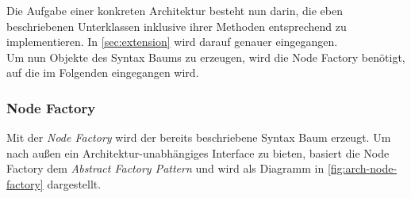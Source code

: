 Die Aufgabe einer konkreten Architektur besteht nun darin, die eben beschriebenen
Unterklassen inklusive ihrer Methoden entsprechend zu implementieren. In
\autoref{sec:extension} wird darauf genauer eingegangen. \\
Um nun Objekte des Syntax Baums zu erzeugen, wird die Node Factory benötigt, auf
die im Folgenden eingegangen wird.

\subsubsection{Node Factory}
\label{module-arch-node-factory}

Mit der \textit{Node Factory} wird der bereits beschriebene Syntax Baum erzeugt.
Um nach außen ein Architektur-unabhängiges Interface zu bieten, basiert die
Node Factory dem \textit{Abstract Factory Pattern} und wird als Diagramm in
\autoref{fig:arch-node-factory} dargestellt.

